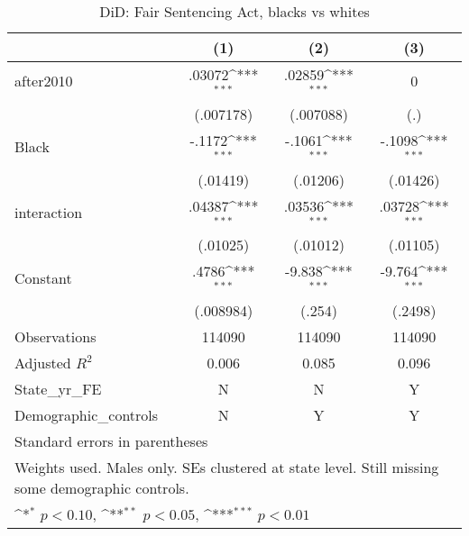 \begin{table}[htbp]\centering
\def\sym#1{\ifmmode^{#1}\else\(^{#1}\)\fi}
\caption{DiD: Fair Sentencing Act, blacks vs whites}
\begin{tabular}{l*{3}{c}}
\hline\hline
                    &\multicolumn{1}{c}{(1)}         &\multicolumn{1}{c}{(2)}         &\multicolumn{1}{c}{(3)}         \\
\hline
after2010           &      .03072\sym{***}&      .02859\sym{***}&           0         \\
                    &   (.007178)         &   (.007088)         &         (.)         \\
[1em]
Black               &      -.1172\sym{***}&      -.1061\sym{***}&      -.1098\sym{***}\\
                    &    (.01419)         &    (.01206)         &    (.01426)         \\
[1em]
interaction         &      .04387\sym{***}&      .03536\sym{***}&      .03728\sym{***}\\
                    &    (.01025)         &    (.01012)         &    (.01105)         \\
[1em]
Constant            &       .4786\sym{***}&      -9.838\sym{***}&      -9.764\sym{***}\\
                    &   (.008984)         &      (.254)         &     (.2498)         \\
\hline
Observations        &      114090         &      114090         &      114090         \\
Adjusted \(R^{2}\)  &       0.006         &       0.085         &       0.096         \\
State\_yr\_FE         &           N         &           N         &           Y         \\
Demographic\_controls&           N         &           Y         &           Y         \\
\hline\hline
\multicolumn{4}{l}{\footnotesize Standard errors in parentheses}\\
\multicolumn{4}{l}{\footnotesize Weights used. Males only. SEs clustered at state level. Still missing some demographic controls.}\\
\multicolumn{4}{l}{\footnotesize \sym{*} \(p<0.10\), \sym{**} \(p<0.05\), \sym{***} \(p<0.01\)}\\
\end{tabular}
\end{table}
